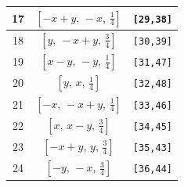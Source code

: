 \documentclass[fleqn,8pt]{jsarticle}
\begin{document}
\begin{longtable}{ccc}
17 & $\left[ - x + y,\, - x,\, \frac{1}{4} \right]$ & {\tt [29,38]} \\ \hline
18 & $\left[ y,\, - x + y,\, \frac{3}{4} \right]$ & {\tt [30,39]} \\ \hline
19 & $\left[ x - y,\, - y,\, \frac{1}{4} \right]$ & {\tt [31,47]} \\ \hline
20 & $\left[ y,\, x,\, \frac{1}{4} \right]$ & {\tt [32,48]} \\ \hline
21 & $\left[ - x,\, - x + y,\, \frac{1}{4} \right]$ & {\tt [33,46]} \\ \hline
22 & $\left[ x,\, x - y,\, \frac{3}{4} \right]$ & {\tt [34,45]} \\ \hline
23 & $\left[ - x + y,\, y,\, \frac{3}{4} \right]$ & {\tt [35,43]} \\ \hline
24 & $\left[ - y,\, - x,\, \frac{3}{4} \right]$ & {\tt [36,44]} \\
\end{longtable}
\renewcommand{\arraystretch}{1.2}
\end{document}
